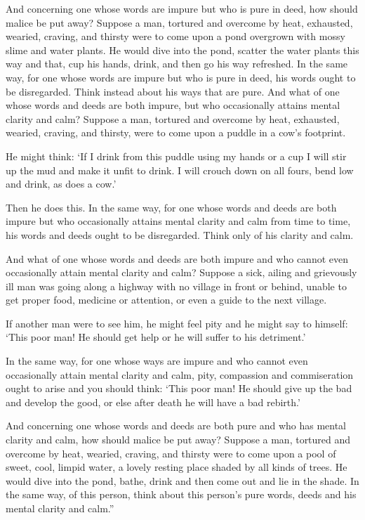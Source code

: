 \documentclass[10pt, openright]{book}
\begin{document}
And concerning one whose words are impure but who is pure in deed, how should malice be put away? Suppose a man, tortured and overcome by heat, exhausted, wearied, craving, and thirsty were to come upon a pond overgrown with mossy slime and water plants. He would dive into the pond, scatter the water plants this way and that, cup his hands, drink, and then go his way refreshed. In the same way, for one whose words are impure but who is pure in deed, his words ought to be disregarded. Think instead about his ways that are pure. And what of one whose words and deeds are both impure, but who occasionally attains mental clarity and calm? Suppose a man, tortured and overcome by heat, exhausted, wearied, craving, and thirsty, were to come upon a puddle in a cow’s footprint.


He might think: ‘If I drink from this puddle using my hands or a cup I will stir up the mud and make it unfit to drink. I will crouch down on all fours, bend low and drink, as does a cow.’


Then he does this. In the same way, for one whose words and deeds are both impure but who occasionally attains mental clarity and calm from time to time, his words and deeds ought to be disregarded. Think only of his clarity and calm.


And what of one whose words and deeds are both impure and who cannot even occasionally attain mental clarity and calm? Suppose a sick, ailing and grievously ill man was going along a highway with no village in front or behind, unable to get proper food, medicine or attention, or even a guide to the next village.


If another man were to see him, he might feel pity and he might say to himself: ‘This poor man! He should get help or he will suffer to his detriment.’


In the same way, for one whose ways are impure and who cannot even occasionally attain mental clarity and calm, pity, compassion and commiseration ought to arise and you should think: ‘This poor man! He should give up the bad and develop the good, or else after death he will have a bad rebirth.’


And concerning one whose words and deeds are both pure and who has mental clarity and calm, how should malice be put away? Suppose a man, tortured and overcome by heat, wearied, craving, and thirsty were to come upon a pool of sweet, cool, limpid water, a lovely resting place shaded by all kinds of trees. He would dive into the pond, bathe, drink and then come out and lie in the shade. In the same way, of this person, think about this person’s pure words, deeds and his mental clarity and calm.”
\end{document}
